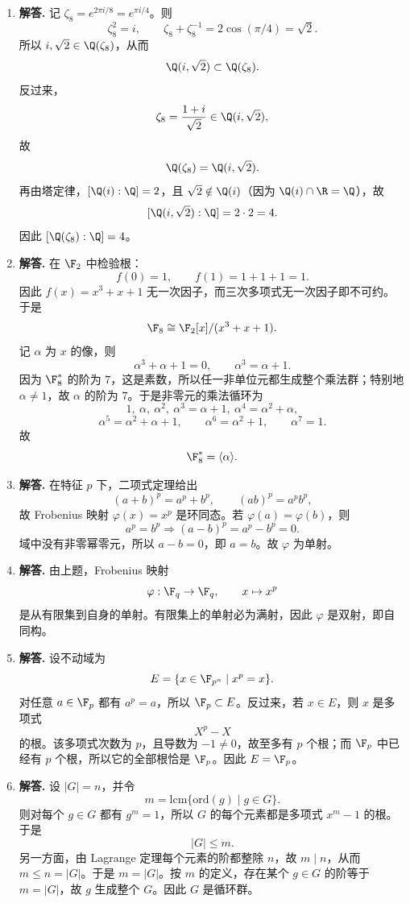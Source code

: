 \begin{enumerate}[label=\textbf{\arabic*.}, leftmargin=*, itemsep=1em]
\item \textbf{解答.} 记 $\zeta_8=e^{2\pi i/8}=e^{\pi i/4}$。则
\[
\zeta_8^2=i,
\qquad
\zeta_8+\zeta_8^{-1}=2\cos(\pi/4)=\sqrt2.
\]
所以 $i,\sqrt2\in\Q(\zeta_8)$，从而
\[
\Q(i,\sqrt2)\subset \Q(\zeta_8).
\]
反过来，
\[
\zeta_8=\frac{1+i}{\sqrt2}\in\Q(i,\sqrt2),
\]
故
\[
\Q(\zeta_8)=\Q(i,\sqrt2).
\]
再由塔定律，$[\Q(i):\Q]=2$，且 $\sqrt2\notin\Q(i)$（因为 $\Q(i)\cap\R=\Q$），故
\[
[\Q(i,\sqrt2):\Q]=2\cdot2=4.
\]
因此 $[\Q(\zeta_8):\Q]=4$。

\item \textbf{解答.} 在 $\F_2$ 中检验根：
\[
f(0)=1,\qquad f(1)=1+1+1=1.
\]
因此 $f(x)=x^3+x+1$ 无一次因子，而三次多项式无一次因子即不可约。于是
\[
\F_8\cong \F_2[x]/(x^3+x+1).
\]
记 $\alpha$ 为 $x$ 的像，则
\[
\alpha^3+\alpha+1=0,
\qquad \alpha^3=\alpha+1.
\]
因为 $\F_8^*$ 的阶为 $7$，这是素数，所以任一非单位元都生成整个乘法群；特别地 $\alpha\ne1$，故 $\alpha$ 的阶为 $7$。于是非零元的乘法循环为
\[
1,\ \alpha,\ \alpha^2,\ \alpha^3=\alpha+1,\ \alpha^4=\alpha^2+\alpha,
\]
\[
\alpha^5=\alpha^2+\alpha+1,\qquad \alpha^6=\alpha^2+1,\qquad \alpha^7=1.
\]
故
\[
\F_8^*=\langle \alpha\rangle.
\]

\item \textbf{解答.} 在特征 $p$ 下，二项式定理给出
\[
(a+b)^p=a^p+b^p,
\qquad (ab)^p=a^pb^p,
\]
故 Frobenius 映射 $\varphi(x)=x^p$ 是环同态。若 $\varphi(a)=\varphi(b)$，则
\[
a^p=b^p\Longrightarrow (a-b)^p=a^p-b^p=0.
\]
域中没有非零幂零元，所以 $a-b=0$，即 $a=b$。故 $\varphi$ 为单射。

\item \textbf{解答.} 由上题，Frobenius 映射
\[
\varphi:\F_q\to\F_q,
\qquad x\mapsto x^p
\]
是从有限集到自身的单射。有限集上的单射必为满射，因此 $\varphi$ 是双射，即自同构。

\item \textbf{解答.} 设不动域为
\[
E=\{x\in\F_{p^n}\mid x^p=x\}.
\]
对任意 $a\in\F_p$ 都有 $a^p=a$，所以 $\F_p\subset E$。反过来，若 $x\in E$，则 $x$ 是多项式
\[
X^p-X
\]
的根。该多项式次数为 $p$，且导数为 $-1\neq0$，故至多有 $p$ 个根；而 $\F_p$ 中已经有 $p$ 个根，所以它的全部根恰是 $\F_p$。因此 $E=\F_p$。

\item \textbf{解答.} 设 $|G|=n$，并令
\[
m=\mathrm{lcm}\{\mathrm{ord}(g)\mid g\in G\}.
\]
则对每个 $g\in G$ 都有 $g^m=1$，所以 $G$ 的每个元素都是多项式 $x^m-1$ 的根。于是
\[
|G|\le m.
\]
另一方面，由 Lagrange 定理每个元素的阶都整除 $n$，故 $m\mid n$，从而 $m\le n=|G|$。于是 $m=|G|$。按 $m$ 的定义，存在某个 $g\in G$ 的阶等于 $m=|G|$，故 $g$ 生成整个 $G$。因此 $G$ 是循环群。


\end{enumerate}
